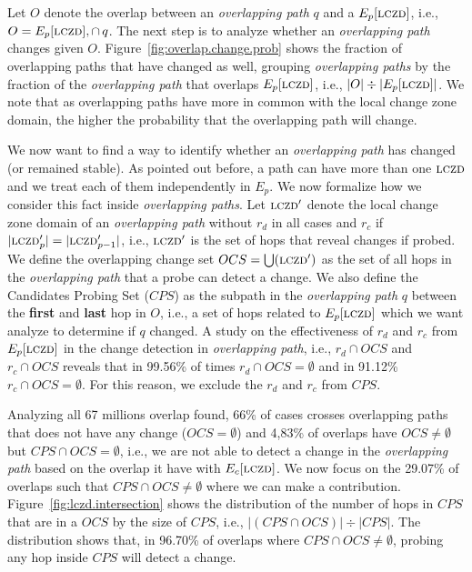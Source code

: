 Let $O$ denote the overlap between an \emph{overlapping path} $q$ and a 
$E_p[\mathrm{\textsc{lczd}}]$, i.e., $O = E_p[\mathrm{\textsc{lczd}}],\cap\,q$. The next step 
is to analyze whether an \emph{overlapping path} changes given $O$.
Figure~\ref{fig:overlap.change.prob} shows
the fraction of overlapping paths that have changed as well, grouping
\emph{overlapping paths} by the fraction of the \emph{overlapping path}
that overlaps $E_p[\mathrm{\textsc{lczd}}]$, i.e.,
$|O|\div|E_p[\mathrm{\textsc{lczd}}]|$.  We note that as overlapping paths
have more in common with the local change zone domain, the higher
the probability that the overlapping path will change. 

We now want to find a way to identify whether an \emph{overlapping path}
has changed (or remained stable). As pointed out before, a path can have more
than one $\mathrm{\textsc{lczd}}$ and we treat each of them independently in $E_p$.
We now formalize how we consider this fact inside \emph{overlapping paths}.
Let $\mathrm{\textsc{lczd}}'$ denote the local change zone domain of an \emph{overlapping path}
without $r_d$ in all cases and $r_c$ if $|\mathrm{\textsc{lczd}}'_{p}| = |\mathrm{\textsc{lczd}}'_{p-1}|$, i.e.,
$\mathrm{\textsc{lczd}}'$ is the set of hops that reveal changes if probed. We define the
overlapping change set $OCS = \bigcup(\mathrm{\textsc{lczd}}')$ as the set of all hops in the
\emph{overlapping path} that a probe can detect a change.
We also define the Candidates Probing Set ($CPS$) as the subpath 
in the \emph{overlapping path} $q$ between the \textbf{first} and \textbf{last} 
hop in $O$, i.e., a set of hops related to $E_p[\mathrm{\textsc{lczd}}]$ which we want analyze
to determine if $q$ changed. A study on the effectiveness of $r_d$ and $r_c$ 
from $E_p[\mathrm{\textsc{lczd}}]$ in the change detection in \emph{overlapping path}, i.e.,
$r_d \cap OCS$ and $r_c \cap OCS$ reveals that in 99.56\% of times 
$r_d \cap OCS = \emptyset$ and in 91.12\% $r_c \cap OCS = \emptyset$.
For this reason, we exclude the $r_d$ and $r_c$ from $CPS$.

Analyzing all 67 millions overlap found, 66\% of cases crosses overlapping paths 
that does not have any change ($OCS = \emptyset$) and 4,83\% of overlaps have 
$OCS \ne \emptyset$ but $CPS \cap OCS = \emptyset$, 
i.e., we are not able to detect a change in the \emph{overlapping path}
based on the overlap it have with $E_c[\mathrm{\textsc{lczd}}]$. 
We now focus on the 29.07\% of overlaps such that $CPS \cap OCS \ne \emptyset$
where we can make a contribution. Figure~\ref{fig:lczd.intersection}  
shows the distribution of the number of hops in $CPS$ that are in a $OCS$ by the size of $CPS$,
i.e., $|(CPS \cap OCS)| \div |CPS|$.  The distribution shows that,
in 96.70\% of overlaps where $CPS \cap OCS \ne \emptyset$, probing any hop inside $CPS$ 
will detect a change.

